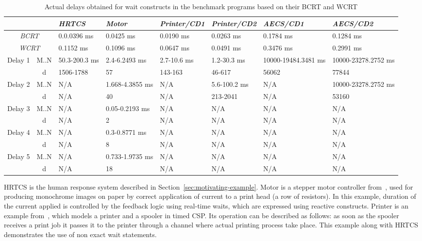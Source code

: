 {\renewcommand{\arraystretch}{0.6}
\begin{table*}[t!]
\centering
	\caption{Actual delays obtained for wait constructs in the
benchmark programs based on their BCRT and WCRT}
\begin{tabular}{ c c l l l l l l }
	\toprule
	\multicolumn{2}{c}{} & \emph{HRTCS} & \emph{Motor} & \emph{Printer/CD1} &
	\emph{Printer/CD2} & \emph{AECS/CD1} &	\emph{AECS/CD2} \\ 
	\midrule
	\multicolumn{2}{c}{\emph{BCRT}}	& 0.0.0396 ms	& 0.0425 ms & 0.0190 ms &
	0.0263 ms & 0.1784 ms & 0.1284 ms\\ 
	\cmidrule(r){1-8}
	\multicolumn{2}{c}{\emph{WCRT}} &0.1152 ms & 0.1096 ms & 0.0647 ms
	& 0.0491 ms & 0.3476 ms & 0.2991 ms\\ 
	\cmidrule(r){1-8}

	\multirow{2}{*}{Delay 1} & M..N & 50.3-200.3 ms	& 2.4-6.2493 ms	  &
	2.7-10.6 ms & 1.2-30.3 ms & 10000-19484.3481 ms& 10000-23278.2752 ms \\
	\cmidrule(r){2-8}
	& d &1506-1788 & 57 & 143-163 & 46-617 & 56062 &77844\\ 
	\cmidrule(r){1-8}
	\multirow{2}{*}{Delay 2} & M..N & N/A & 1.668-4.3855 ms & N/A &
	5.6-100.2 ms & N/A &10000-23278.2752 ms\\ 
	\cmidrule(r){2-8}
	& d & N/A & 40 & N/A & 213-2041 & N/A &53160\\ 
	\cmidrule(r){1-8}
	\multirow{2}{*}{Delay 3} & M..N & N/A & 0.05-0.2193 ms & N/A & N/A & N/A
	&N/A\\ 
	\cmidrule(r){2-8}
	& d & N/A & 2 & N/A & N/A & N/A &N/A\\ 
	\cmidrule(r){1-8}
	\multirow{2}{*}{Delay 4} & M..N & N/A & 0.3-0.8771 ms & N/A & N/A & N/A
	&N/A\\ 
	\cmidrule(r){2-8}
	& d & N/A & 8 & N/A & N/A & N/A &N/A\\ 
	\cmidrule(r){1-8}
	\multirow{2}{*}{Delay 5} & M..N & N/A & 0.733-1.9735 ms & N/A & N/A & N/A
	&N/A\\ 
	\cmidrule(r){2-8}
	& d & N/A & 18 & N/A
	& N/A & N/A &N/A\\ \bottomrule
\end{tabular}
\label{fig:comparison}
\end{table*}
}

HRTCS is the human response system described in
Section~\ref{sec:motivating-example}. Motor is a stepper motor
controller from~\cite{Bourke2009a}, used for producing monochrome images
on paper by correct application of current to a print head (a row of
resistors). In this example, duration of the current applied is
controlled by the feedback logic using real-time waits, which are
expressed using reactive constructs. Printer is an example
from~\cite{Schneider:1999:CRT:555233}, which models a printer and a
spooler in timed CSP. Its operation can be described as follows: as soon
as the spooler receives a print job it passes it to the printer through
a channel where actual printing process take place. This example along
with HRTCS demonstrates the use of non exact wait statements.

